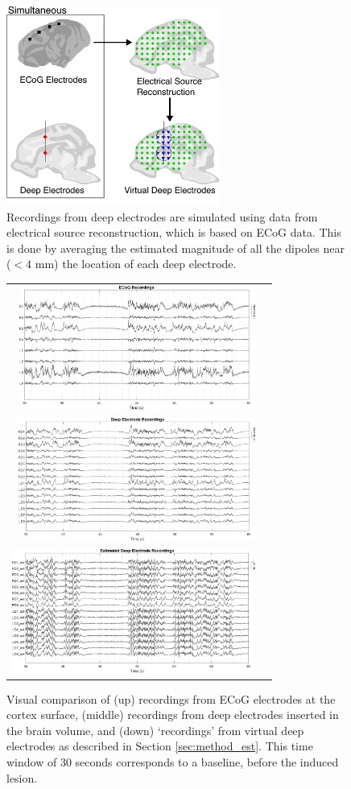 \documentclass[draftcls, onecolumn, peerreview]{IEEEtran}
\begin{document}
\begin{figure}[!t]
\centering
\includegraphics[width=7cm]{./img/diagram_v2}
\caption{Recordings from deep electrodes are simulated using data from electrical source reconstruction, which is based on ECoG data. This is done by averaging the estimated magnitude of all the dipoles near ($<4$ mm) the location of each deep electrode.
}
\label{fig:raw}
\end{figure}

\begin{figure}[!t]
    \centering
    \begin{tabular}{rr}
    \includegraphics[width=7.75cm]{./graphs/ctrl_ecog} \\
    \includegraphics[width=7.8cm]{./graphs/ctrl_seeg} \\
    \includegraphics[width=8cm]{./graphs/ctrl_estim}
    \end{tabular}
\caption{Visual comparison of (up) recordings from ECoG electrodes at the cortex surface, (middle) recordings from deep electrodes inserted in the brain volume, and (down) `recordings' from virtual deep electrodes as described in Section \ref{sec:method_est}. This time window of 30 seconds corresponds to a baseline, before the induced lesion.}
    \label{fig:control}
\end{figure}
\end{document}

